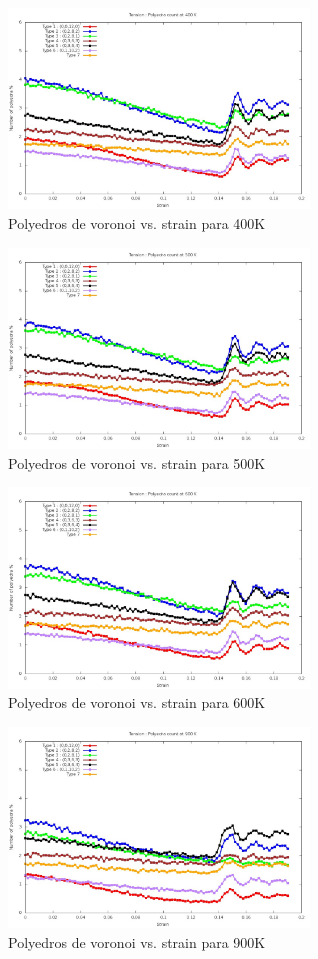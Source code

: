 \documentclass[10pt, oneside]{article} %
\begin{document}
\begin{figure}[H]
\centering
\includegraphics[width=8cm]{Figures/Tens_Polyedra_400K.jpeg}
\caption{Polyedros de voronoi vs. strain para 400K}
\end{figure}

\begin{figure}[H]
\centering
\includegraphics[width=8cm]{Figures/Tens_Polyedra_500K.jpeg}
\caption{Polyedros de voronoi vs. strain para 500K}
\end{figure}

\begin{figure}[H]
\centering
\includegraphics[width=8cm]{Figures/Tens_Polyedra_600K.jpeg}
\caption{Polyedros de voronoi vs. strain para 600K}
\end{figure}

\begin{figure}[H]
\centering
\includegraphics[width=8cm]{Figures/Tens_Polyedra_900K.jpeg}
\caption{Polyedros de voronoi vs. strain para 900K}
\end{figure}
\end{document}
